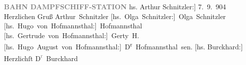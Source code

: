 \begin{ledgroupsized}[t]{13cm}
           \pstart
           \noindent{}\centering{}\textcolor{gray}{\textbf{BAHN {\kaufmannsund}
                           DAMPFSCHIFF-STATION}}\pend
           \pstart
           \raggedleft{}{[}hs. Arthur Schnitzler:{]} 7. 9. 904\pend
           \pstart
           Herzlichen Gruß \spacefill\mbox{Arthur Schnitzler}\pend
           \pstart
           \spacefill\mbox{{[}hs. Olga Schnitzler:{]} Olga Schnitzler}\pend
           \pstart
           \spacefill\mbox{{[}hs. Hugo von Hofmannsthal:{]} Hofmannsthal}\pend
           \pstart
           \spacefill\mbox{{[}hs. Gertrude von Hofmannsthal:{]} Gerty H.}\pend
           \pstart
           \spacefill\mbox{{[}hs. Hugo August von Hofmannsthal:{]} D\textsuperscript{r}{ }Hofmannsthal sen.}\pend
           \pstart
           {[}hs. Burckhard:{]} Herzlichſt \spacefill\mbox{D\textcolor{gray}{\textsuperscript{r}}{ }Burckhard}\pend
           
         
         \endnumbering{}\end{ledgroupsized}  \newcommand{\dateiname}{L01439}\newcommand{\titel}{Arthur Schnitzler u. a. an Gerhart Hauptmann, 7. 9. 1904}\newcommand{\editorInnen}{Martin Anton Müller und Gerd-Hermann Susen}
      